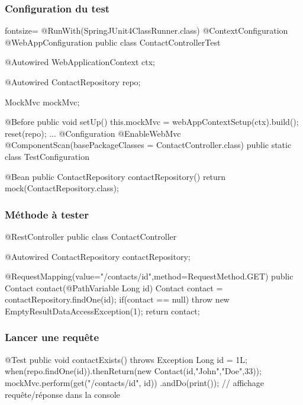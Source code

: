 \begin{frame}[fragile]
 \frametitle{Configuration du test}

 \begin{javacode*}{fontsize=\tiny}
@RunWith(SpringJUnit4ClassRunner.class)
@ContextConfiguration
@WebAppConfiguration
public class ContactControllerTest {

    @Autowired WebApplicationContext ctx;

    @Autowired ContactRepository repo;

    MockMvc mockMvc;

    @Before public void setUp() {
        this.mockMvc = webAppContextSetup(ctx).build();
        reset(repo);
    }
    ...
    @Configuration
    @EnableWebMvc
    @ComponentScan(basePackageClasses = ContactController.class)
    public static class TestConfiguration {

        @Bean
        public ContactRepository contactRepository() {
            return mock(ContactRepository.class);
        }

    }
}
 \end{javacode*}

\end{frame}


\begin{frame}[fragile]
 \frametitle{Méthode à tester}

 \begin{javacode}
@RestController
public class ContactController {

  @Autowired ContactRepository contactRepository;

  @RequestMapping(value="/contacts/{id}",method=RequestMethod.GET)
  public Contact contact(@PathVariable Long id) {
    Contact contact = contactRepository.findOne(id);
    if(contact == null) {
      throw new EmptyResultDataAccessException(1);
    }
    return contact;
  }

}
 \end{javacode}


\end{frame}

\begin{frame}[fragile]
 \frametitle{Lancer une requête}

 \begin{javacode}
@Test
public void contactExists() throws Exception {
    Long id = 1L;
    when(repo.findOne(id)).thenReturn(new Contact(id,"John","Doe",33));
    mockMvc.perform(get("/contacts/{id}", id))
         .andDo(print()); // affichage requ\^ete/r\'eponse dans la console
}
 \end{javacode}

\end{frame}

